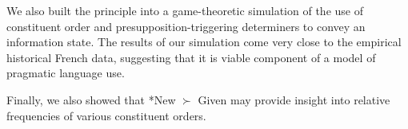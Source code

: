 \documentclass[output=paper,modfonts,nonflat]{langsci/langscibook}
\begin{document}
We also built the principle into a game-theoretic simulation of the use of constituent order and presupposition-triggering determiners to convey an information state. The results of our simulation come very close to the empirical historical French data, suggesting that it is viable component of a model of pragmatic language use. 

Finally, we also showed that *New $\succ$ Given may provide insight into relative frequencies of various constituent orders.


{\sloppy\printbibliography[heading=subbibliography,notkeyword=this]}
\end{document}
